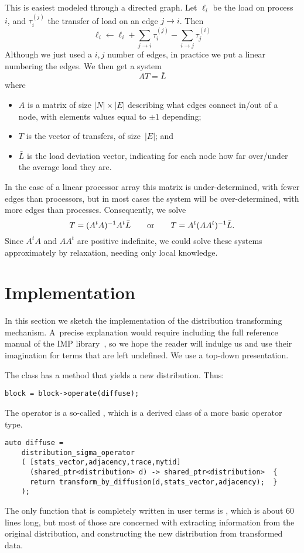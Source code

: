 \documentclass[11pt,fleqn]{article}
\begin{document}
This is easiest modeled through a directed graph. Let $\ell_i$ be the
load on process~$i$, and $\tau^{(j)}_i$ the transfer of load on an edge
$j\rightarrow i$. Then
\[ \ell_i \leftarrow \ell_i
    + \sum_{j\rightarrow i} \tau^{(j)}_i
    - \sum_{i\rightarrow j} \tau^{(i)}_j
\]
Although we just used a $i,j$ number of edges, in practice
we put a linear numbering the edges. We then get a system
\[ AT=\bar L \]
where
\begin{itemize}
\item $A$ is a matrix of size $|N|\times|E|$ describing what edges
  connect in/out of a node, with elements values equal to $\pm1$ depending;
\item $T$ is the vector of transfers, of size~$|E|$; and
\item $\bar L$ is the load deviation vector, indicating for each node
  how far over/under the average load they are.
\end{itemize}

In the case of a linear processor array this matrix is
under-determined, with fewer edges than processors, but in most cases the
system will be over-determined, with more edges than processes.
Consequently, we solve
%
\[ T= (A^tA)^{-1} A^t\bar L \qquad\hbox{or}\qquad T=A^t(AA^t)^{-1} \bar L. \]
%
Since $A^tA$ and $AA^t$ are positive indefinite, we could solve these systems
approximately by relaxation, needing only local knowledge.

\section{Implementation}

In this section we sketch the implementation of the distribution
transforming mechanism. A~precise explanation would require including
the full reference manual of the \ac{IMP} library~\cite{IMPcode-repo},
so we hope the reader will indulge us and use their imagination for
terms that are left undefined. We use a top-down presentation.

The  class has a method  that yields a new
distribution. Thus:
\begin{verbatim}
block = block->operate(diffuse);
\end{verbatim}
The  operator is a so-called
, which is a derived class of a more
basic operator type.
\begin{verbatim}
auto diffuse =
    distribution_sigma_operator
    ( [stats_vector,adjacency,trace,mytid]
      (shared_ptr<distribution> d) -> shared_ptr<distribution>  {
      return transform_by_diffusion(d,stats_vector,adjacency);  }
    );
\end{verbatim}
The only function that is completely written in user terms is
, which is about 60 lines long, but most of
those are concerned with extracting information from the original
distribution, and constructing the new distribution from transformed
data.
\end{document}

